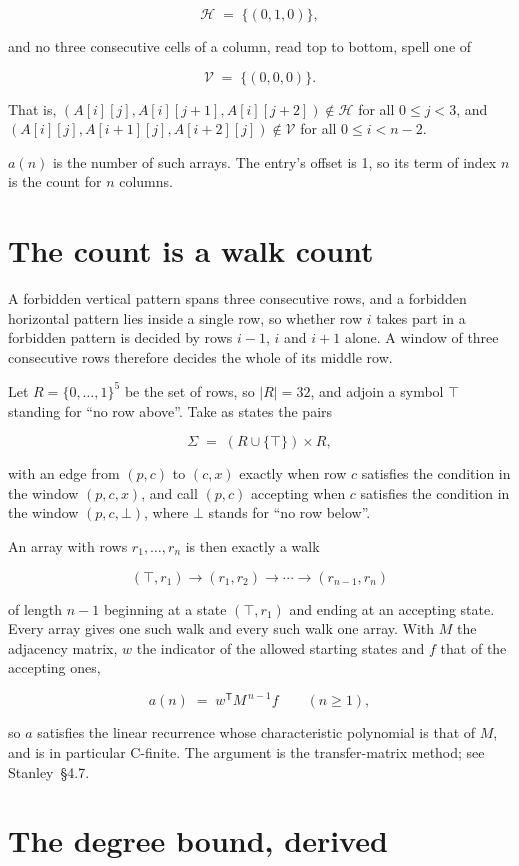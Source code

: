 \documentclass[11pt]{article}
\theoremstyle{definition}
\begin{document}
\[\mathcal{H} \;=\; \{(0,1,0)\},\]

and no three consecutive cells of a column, read top to bottom, spell one of

\[\mathcal{V} \;=\; \{(0,0,0)\}.\]

That is, $(A[i][j],A[i][j{+}1],A[i][j{+}2]) \notin \mathcal{H}$ for all $0 \le j < 3$, and $(A[i][j],A[i{+}1][j],A[i{+}2][j]) \notin \mathcal{V}$ for all $0 \le i < n-2$.

$a(n)$ is the number of such arrays. The entry's offset is 1, so its term of index $n$ is the count for $n$ columns.

\section{The count is a walk count}

A forbidden vertical pattern spans three consecutive rows, and a forbidden horizontal pattern lies inside a single row, so whether row $i$ takes part in a forbidden pattern is decided by rows $i-1$, $i$ and $i+1$ alone. A window of three consecutive rows therefore decides the whole of its middle row.

Let $R = \{0,\dots,1\}^{5}$ be the set of rows, so $|R| = 32$, and adjoin a symbol $\top$ standing for ``no row above''. Take as states the pairs

\[\Sigma \;=\; (R \cup \{\top\}) \times R,\]

with an edge from $(p,c)$ to $(c,x)$ exactly when row $c$ satisfies the condition in the window $(p,c,x)$, and call $(p,c)$ accepting when $c$ satisfies the condition in the window $(p,c,\bot)$, where $\bot$ stands for ``no row below''.

An array with rows $r_1,\dots,r_n$ is then exactly a walk

\[(\top,r_1) \to (r_1,r_2) \to \cdots \to (r_{n-1},r_n)\]

of length $n-1$ beginning at a state $(\top,r_1)$ and ending at an accepting state. Every array gives one such walk and every such walk one array. With $M$ the adjacency matrix, $w$ the indicator of the allowed starting states and $f$ that of the accepting ones,

\[a(n) \;=\; w^{\mathsf T} M^{\,n-1} f \qquad (n \ge 1),\]

so $a$ satisfies the linear recurrence whose characteristic polynomial is that of $M$, and is in particular C-finite. The argument is the transfer-matrix method; see Stanley~\S4.7.

\section{The degree bound, derived}
\end{document}
